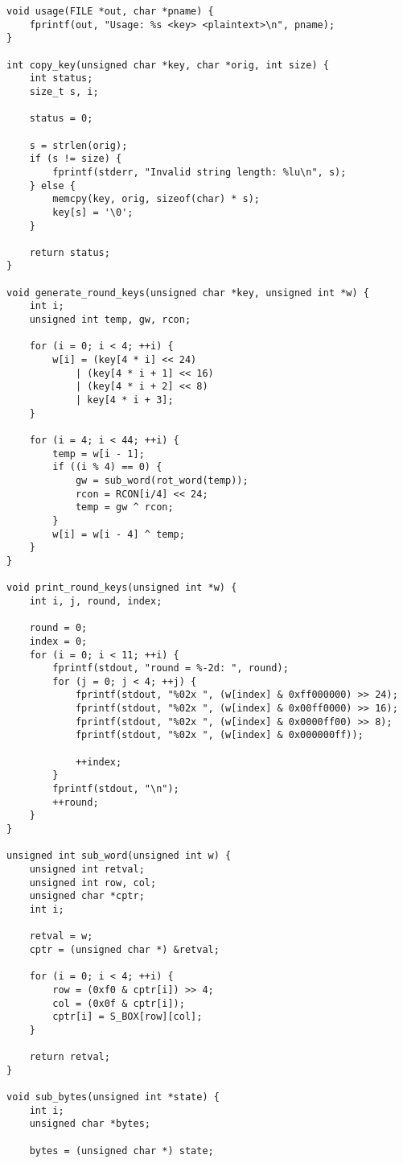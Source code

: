 \documentclass[a4paper]{report}
\begin{document}
\begin{lstlisting}
void usage(FILE *out, char *pname) {
    fprintf(out, "Usage: %s <key> <plaintext>\n", pname);
}

int copy_key(unsigned char *key, char *orig, int size) {
    int status;
    size_t s, i;

    status = 0;

    s = strlen(orig);
    if (s != size) {
        fprintf(stderr, "Invalid string length: %lu\n", s);
    } else {
        memcpy(key, orig, sizeof(char) * s);
        key[s] = '\0';
    }

    return status;
}

void generate_round_keys(unsigned char *key, unsigned int *w) {
    int i;
    unsigned int temp, gw, rcon;

    for (i = 0; i < 4; ++i) {
        w[i] = (key[4 * i] << 24)
            | (key[4 * i + 1] << 16)
            | (key[4 * i + 2] << 8)
            | key[4 * i + 3];
    }

    for (i = 4; i < 44; ++i) {
        temp = w[i - 1];
        if ((i % 4) == 0) {
            gw = sub_word(rot_word(temp));
            rcon = RCON[i/4] << 24;
            temp = gw ^ rcon;
        }
        w[i] = w[i - 4] ^ temp;
    }
}

void print_round_keys(unsigned int *w) {
    int i, j, round, index;

    round = 0;
    index = 0;
    for (i = 0; i < 11; ++i) {
        fprintf(stdout, "round = %-2d: ", round);
        for (j = 0; j < 4; ++j) {
            fprintf(stdout, "%02x ", (w[index] & 0xff000000) >> 24);
            fprintf(stdout, "%02x ", (w[index] & 0x00ff0000) >> 16);
            fprintf(stdout, "%02x ", (w[index] & 0x0000ff00) >> 8);
            fprintf(stdout, "%02x ", (w[index] & 0x000000ff));

            ++index;
        }
        fprintf(stdout, "\n");
        ++round;
    }
}

unsigned int sub_word(unsigned int w) {
    unsigned int retval;
    unsigned int row, col;
    unsigned char *cptr;
    int i;

    retval = w;
    cptr = (unsigned char *) &retval;

    for (i = 0; i < 4; ++i) { 
        row = (0xf0 & cptr[i]) >> 4;
        col = (0x0f & cptr[i]);
        cptr[i] = S_BOX[row][col];
    }

    return retval;
}

void sub_bytes(unsigned int *state) {
    int i;
    unsigned char *bytes;

    bytes = (unsigned char *) state;


\end{lstlisting}
\end{document}
